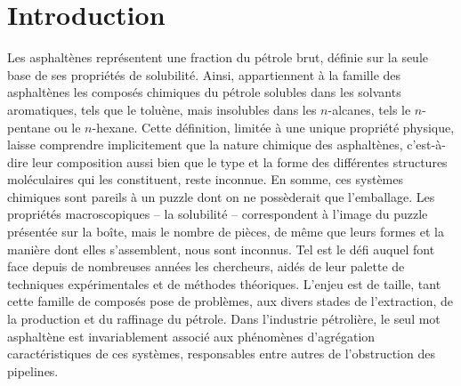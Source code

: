 	\chapter*{Introduction}
	\minitoc
	\restoregeometry
	
	
	Les asphaltènes représentent une fraction du pétrole brut, définie sur la seule base de ses propriétés de solubilité. Ainsi, appartiennent à la famille des asphaltènes les composés chimiques du pétrole solubles dans les solvants aromatiques, tels que le toluène, mais insolubles dans les $n$-alcanes, tels le $n$-pentane ou le $n$-hexane. Cette définition, limitée à une unique propriété physique, laisse comprendre implicitement que la nature chimique des asphaltènes, c'est-à-dire leur composition aussi bien que le type et la forme des différentes structures moléculaires qui les constituent, reste inconnue. En somme, ces systèmes chimiques sont pareils à un puzzle dont on ne possèderait que l'emballage. Les propriétés macroscopiques -- la solubilité -- correspondent à l'image du puzzle présentée sur la boîte, mais le nombre de pièces, de même que leurs formes et la manière dont elles s'assemblent, nous sont inconnus. Tel est le défi auquel font face depuis de nombreuses années les chercheurs, aidés de leur palette de techniques expérimentales et de méthodes théoriques. L'enjeu est de taille, tant cette famille de composés pose de problèmes, aux divers stades de l'extraction, de la production et du raffinage du pétrole. Dans l'industrie pétrolière, le seul mot \og asphaltène \fg{} est invariablement associé aux phénomènes d'agrégation caractéristiques de ces systèmes, responsables entre autres de l'obstruction des pipelines. \\
	
